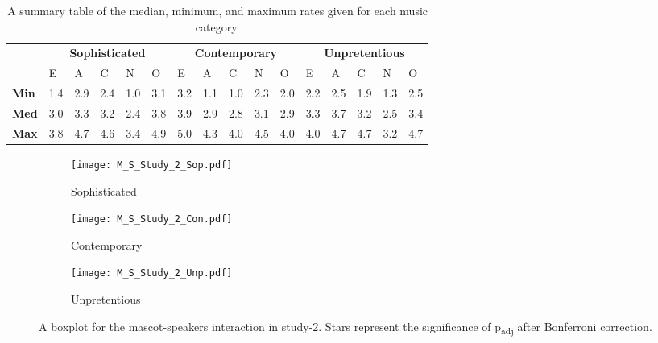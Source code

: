 \begin{table}[hbt!]
    \renewcommand{\arraystretch}{1}
    \begin{center}
        \begin{tabular}{p{}|
        p{}|p{}|p{}|p{}|p{}||
        p{}|p{}|p{}|p{}|p{}||
        p{}|p{}|p{}|p{}|p{}|}
            \cline{2-16}
            & \multicolumn{5}{c||}{\textbf{Sophisticated}} & \multicolumn{5}{c||}{\textbf{Contemporary}}
            & \multicolumn{5}{c|}{\textbf{Unpretentious}} \\
            \cline{2-16}
            & E & A & C & N & O & E & A & C & N & O & E & A & C & N & O     \\
            \cline{2-16}
            \textbf{Min}    & 1.4 & 2.9 & 2.4 & 1.0 & 3.1 & 3.2 & 1.1 & 1.0 & 2.3 & 2.0 & 2.2 & 2.5 & 1.9 & 1.3 & 2.5  \\
            \textbf{Med}    & 3.0 & 3.3 & 3.2 & 2.4 & 3.8 & 3.9 & 2.9 & 2.8 & 3.1 & 2.9 & 3.3 & 3.7 & 3.2 & 2.5 & 3.4   \\
            \textbf{Max}    & 3.8 & 4.7 & 4.6 & 3.4 & 4.9 & 5.0 & 4.3 & 4.0 & 4.5 & 4.0 & 4.0 & 4.7 & 4.7 & 3.2 & 4.7 \\
            \cline{2-16}
        \end{tabular}
        \caption{A summary table of the median, minimum, and maximum rates given for each music category.}
        \label{table:medianMS2}
    \end{center}
\end{table}
\begin{figure}[hbt!]
    \centering
    \begin{subfigure}{.40\textwidth}
        \centering
        \texttt{[image: M\_S\_Study\_2\_Sop.pdf]}
        \caption{Sophisticated}
        \label{fig:sub1}
    \end{subfigure}\hfill%
    \begin{subfigure}{.40\textwidth}
        \centering
        \texttt{[image: M\_S\_Study\_2\_Con.pdf]}
        \caption{Contemporary}
        \label{fig:sub2}
    \end{subfigure}\hfill
    \begin{subfigure}{.40\textwidth}
        \centering
        \texttt{[image: M\_S\_Study\_2\_Unp.pdf]}
        \caption{Unpretentious}
        \label{fig:sub1}
    \end{subfigure}\hfill%
    \caption{A boxplot for the mascot-speakers interaction in study-2.
    Stars represent the significance of p\textsubscript{adj} after Bonferroni correction.}
    \label{fig:MS2}
\end{figure}
